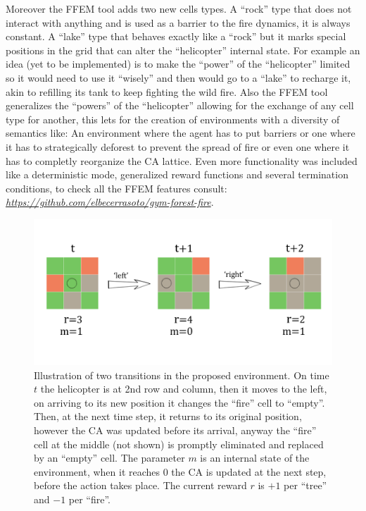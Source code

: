 \documentclass[
  openany]{book}
\begin{document}
Moreover the FFEM tool adds two new cells types. A ``rock'' type that does not interact with anything and is used as a barrier to the fire dynamics, it is always constant. A ``lake'' type that behaves exactly like a ``rock'' but it marks special positions in the grid that can alter the ``helicopter'' internal state. For example an idea (yet to be implemented) is to make the ``power'' of the ``helicopter'' limited so it would need to use it ``wisely'' and then would go to a ``lake'' to recharge it, akin to refilling its tank to keep fighting the wild fire. Also the FFEM tool generalizes the ``powers'' of the ``helicopter'' allowing for the exchange of any cell type for another, this lets for the creation of environments with a diversity of semantics like: An environment where the agent has to put barriers or one where it has to strategically deforest to prevent the spread of fire or even one where it has to completly reorganize the CA lattice. Even more functionality was included like a deterministic mode, generalized reward functions and several termination conditions, to check all the FFEM features consult: \emph{\url{https://github.com/elbecerrasoto/gym-forest-fire}}.



\begin{figure}

{\centering \includegraphics[width=0.8\linewidth]{pics/agent-env_3x3} 

}

\caption{Illustration of two transitions in the proposed environment. On time \(t\) the helicopter is at 2nd row and column, then it moves to the left, on arriving to its new position it changes the ``fire'' cell to ``empty''. Then, at the next time step, it returns to its original position, however the CA was updated before its arrival, anyway the ``fire'' cell at the middle (not shown) is promptly eliminated and replaced by an ``empty'' cell. The parameter \(m\) is an internal state of the environment, when it reaches \(0\) the CA is updated at the next step, before the action takes place. The current reward \(r\) is \(+1\) per ``tree'' and \(-1\) per ``fire''.}\label{fig:thesis-3-3-env}
\end{figure}
\end{document}
